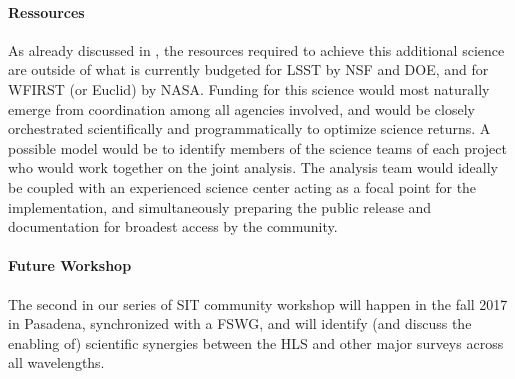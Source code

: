 \paragraph*{Ressources} As already discussed in \citet{Jain:2015cpa}, the resources required to achieve this additional
science are outside of what is currently budgeted for LSST by NSF and DOE, and
for WFIRST (or Euclid) by NASA. Funding for this science would most naturally
emerge from coordination among all agencies involved, and would be closely
orchestrated scientifically and programmatically to optimize science returns. A
possible model would be to identify members of the science teams of each project
who would work together on the joint analysis. The analysis team would ideally
be coupled with an experienced science center acting as a focal point for the
implementation, and simultaneously preparing the public release and documentation for broadest access by the community.

\paragraph*{Future Workshop} The second in our series of SIT community workshop
will happen in the fall 2017 in Pasadena, synchronized with a FSWG, and will
identify (and discuss the enabling of) scientific synergies between the HLS and
other major surveys across all wavelengths.
